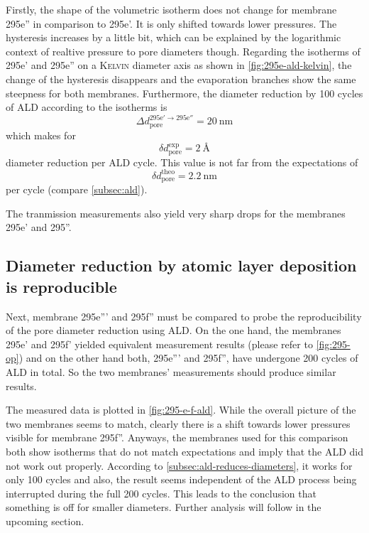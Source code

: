 \documentclass[../thesis.tex]{subfiles}
\begin{document}
      Firstly, the shape of the volumetric isotherm does not change for membrane 295e'' in comparison to 295e'. It is only shifted towards lower pressures. The hysteresis increases by a little bit, which can be explained by the logarithmic context of realtive pressure to pore diameters though. Regarding the isotherms of 295e' and 295e'' on a \textsc{Kelvin} diameter axis as shown in \cref{fig:295e-ald-kelvin}, the change of the hysteresis disappears and the evaporation branches show the same steepness for both membranes. Furthermore, the diameter reduction by 100 cycles of ALD according to the isotherms is
      \begin{equation*}
        \Delta d_\mathrm{pore}^\mathrm{295e'\rightarrow 295e''}=\SI{20}{\nano\meter}
      \end{equation*}
      which makes for
      \begin{equation*}
        \delta d_\mathrm{pore}^\mathrm{exp} =\SI{2}{\angstrom}
      \end{equation*}
      diameter reduction per ALD cycle. This value is not far from the expectations of
      \begin{equation*}
        \delta d_\mathrm{pore}^\mathrm{theo} = \SI{2,2}{\nano\meter}
      \end{equation*}
      per cycle (compare \cref{subsec:ald}).

      The tranmission measurements also yield very sharp drops for the membranes 295e' and 295''.


    \subsection{Diameter reduction by atomic layer deposition is reproducible}
    \label{subsec:diameter-reduction-reproducible}

      Next, membrane 295e''' and 295f'' must be compared to probe the reproducibility of the pore diameter reduction using ALD. On the one hand, the membranes 295e' and 295f' yielded equivalent measurement results (please refer to \cref{fig:295-op}) and on the other hand both, 295e''' and 295f'', have undergone 200 cycles of ALD in total. So the two membranes' measurements should produce similar results.

      The measured data is plotted in \cref{fig:295-e-f-ald}. While the overall picture of the two membranes seems to match, clearly there is a shift towards lower pressures visible for membrane 295f''. Anyways, the membranes used for this comparison both show isotherms that do not match expectations and imply that the ALD did not work out properly. According to \cref{subsec:ald-reduces-diameters}, it works for only 100 cycles and also, the result seems independent of the ALD process being interrupted during the full 200 cycles. This leads to the conclusion that something is off for smaller diameters. Further analysis will follow in the upcoming section.
\end{document}
